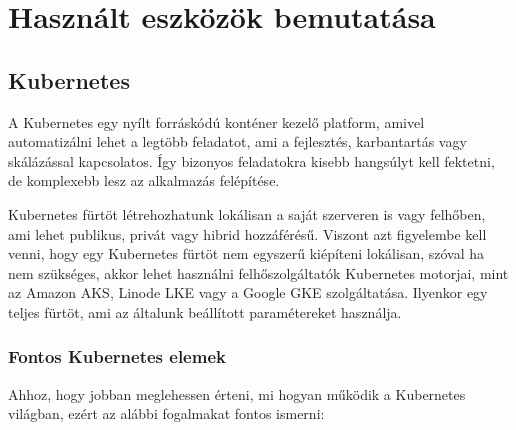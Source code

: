 \chapter{Használt eszközök bemutatása}

\section{Kubernetes}

A Kubernetes egy nyílt forráskódú konténer kezelő platform, amivel automatizálni
lehet a legtöbb feladatot, ami a fejlesztés, karbantartás vagy skálázással 
kapcsolatos. Így bizonyos feladatokra kisebb hangsúlyt kell fektetni, de 
komplexebb lesz az alkalmazás felépítése. 

Kubernetes fürtöt létrehozhatunk lokálisan a saját szerveren is vagy felhőben,
ami lehet publikus, privát vagy hibrid hozzáférésű. Viszont azt figyelembe 
kell venni, hogy egy Kubernetes fürtöt nem egyszerű kiépíteni lokálisan, 
szóval ha nem szükséges, akkor lehet használni felhőszolgáltatók Kubernetes 
motorjai, mint az Amazon AKS, Linode LKE vagy a Google GKE szolgáltatása.
Ilyenkor egy teljes fürtöt, ami az általunk beállított paramétereket használja.

\subsection{Fontos Kubernetes elemek}

Ahhoz, hogy jobban meglehessen érteni, mi hogyan működik a Kubernetes világban,
ezért az alábbi fogalmakat fontos ismerni:

